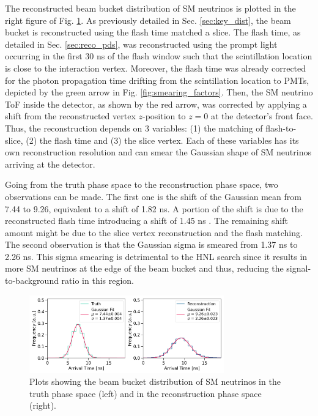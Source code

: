 The reconstructed beam bucket distribution of SM neutrinos is plotted in the right figure of Fig. \ref{fig:gaus_truth_reco}.
As previously detailed in Sec. \ref{sec:key_dist}, the beam bucket is reconstructed using the flash time matched a slice.
The flash time, as detailed in Sec. \ref{sec:reco_pds}, was reconstructed using the prompt light occurring in the first 30 ns of the flash window such that the scintillation location is close to the interaction vertex.
Moreover, the flash time was already corrected for the photon propagation time drifting from the scintillation location to PMTs, depicted by the green arrow in Fig. \ref{fig:smearing_factors}.
Then, the SM neutrino ToF inside the detector, as shown by the red arrow, was corrected by applying a shift from the reconstructed vertex $z$-position to $z = 0$ at the detector's front face.
Thus, the reconstruction depends on 3 variables: (1) the matching of flash-to-slice, (2) the flash time and (3) the slice vertex.
Each of these variables has its own reconstruction resolution and can smear the Gaussian shape of SM neutrinos arriving at the detector.


Going from the truth phase space to the reconstruction phase space, two observations can be made.
The first one is the shift of the Gaussian mean from 7.44 to 9.26, equivalent to a shift of 1.82 ns.
A portion of the shift is due to the reconstructed flash time introducing a shift of 1.45 ns \cite{sbnd_pds_paper}.
The remaining shift amount might be due to the slice vertex reconstruction and the flash matching.      
The second observation is that the Gaussian sigma is smeared from 1.37 ns to 2.26 ns. 
This sigma smearing is detrimental to the HNL search since it results in more SM neutrinos at the edge of the beam bucket and thus, reducing the signal-to-background ratio in this region.                     

\begin{figure}[htbp!]
    \vspace{1cm}
    \centering
    \includegraphics[width=0.75\textwidth]{truth_reco_gaus.png}
    \caption{Plots showing the beam bucket distribution of SM neutrinos in the truth phase space (left) and in the reconstruction phase space (right).}
    \label{fig:gaus_truth_reco}
\end{figure}

